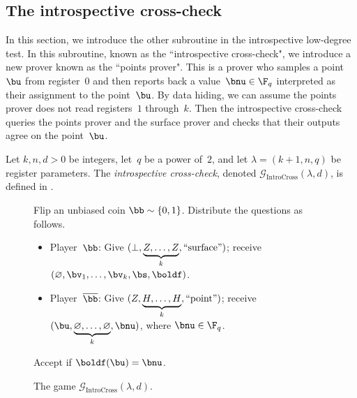 \documentclass[11pt]{article}
\newcommand{\ktimes}[2]{\underbrace{#1, \dots, #1}_{#2}}
\newcommand{\hideq}{H}
\newcommand{\game}{\mathscr{G}}
\begin{document}
\subsection{The introspective cross-check}
In this section, we introduce the other subroutine in the introspective low-degree test.
In this subroutine, known as the ``introspective cross-check",
we introduce a new prover known as the ``points prover".
This is a prover who samples a point~$\bu$ from register~$0$ 
and then reports back a value~$\bnu \in \F_q$
interpreted as their assignment to the point~$\bu$.
By data hiding, we can assume the points prover does not read registers~$1$ through~$k$.
Then the introspective cross-check queries the points prover and the surface prover
and checks that their outputs agree on the point~$\bu$.


\begin{definition}
Let $k, n, d>0$ be integers, let~$q$ be a power of~$2$,
and let $\lambda = (k+1, n, q)$ be register parameters.
The \emph{introspective cross-check}, denoted $\game_{\mathrm{IntroCross}}(\lambda, d)$, is defined in .
\end{definition}
{
\begin{figure}
Flip an unbiased coin $\bb \sim \{0, 1\}$.
Distribute the questions as follows. \label{item:big-low-degree-test}
		\begin{itemize}
		\item[$\circ$] Player~$\bb$: Give $(\bot, \ktimes{Z}{k}, \mathrm{``surface"})$; receive
        $(\varnothing, \bv_1, \dots, \bv_k, \bs, \boldf)$.
		\item[$\circ$] Player~$\overline{\bb}$: Give $(Z, \ktimes{\hideq}{k}, \mathrm{``point"})$;
				receive $(\bu, \ktimes{\varnothing}{k}, \bnu)$, where $\bnu \in \F_q$.
		\end{itemize}
		Accept if $\boldf(\bu) = \bnu$.
	\caption{The game $\game_{\mathrm{IntroCross}}(\lambda, d)$.\label{fig:big-cross-check}}
\end{figure}
}
\end{document}
